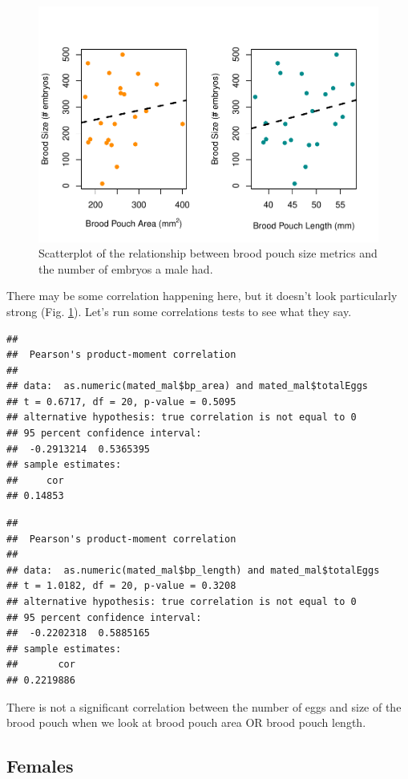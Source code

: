 \documentclass[
]{article}
\begin{document}
\begin{figure}
\centering
\includegraphics{selection_analysis_floridae_files/figure-latex/em-v-bp-1.pdf}
\caption{\label{fig:em-v-bp}Scatterplot of the relationship between brood pouch size metrics and the number of embryos a male had.}
\end{figure}

There may be some correlation happening here, but it doesn't look particularly strong (Fig. \ref{fig:em-v-bp}). Let's run some correlations tests to see what they say.

\begin{verbatim}
## 
##  Pearson's product-moment correlation
## 
## data:  as.numeric(mated_mal$bp_area) and mated_mal$totalEggs
## t = 0.6717, df = 20, p-value = 0.5095
## alternative hypothesis: true correlation is not equal to 0
## 95 percent confidence interval:
##  -0.2913214  0.5365395
## sample estimates:
##     cor 
## 0.14853
\end{verbatim}

\begin{verbatim}
## 
##  Pearson's product-moment correlation
## 
## data:  as.numeric(mated_mal$bp_length) and mated_mal$totalEggs
## t = 1.0182, df = 20, p-value = 0.3208
## alternative hypothesis: true correlation is not equal to 0
## 95 percent confidence interval:
##  -0.2202318  0.5885165
## sample estimates:
##       cor 
## 0.2219886
\end{verbatim}

There is not a significant correlation between the number of eggs and size of the brood pouch when we look at brood pouch area OR brood pouch length.

\hypertarget{females}{%
\subsection{Females}\label{females}}
\end{document}
